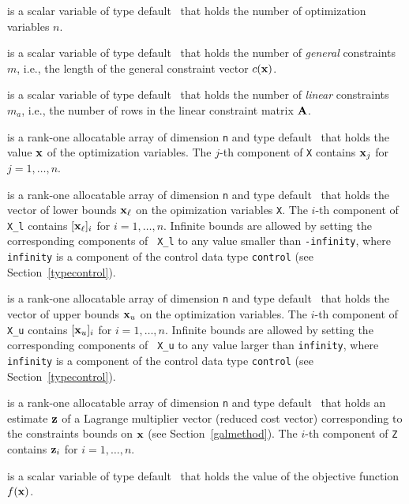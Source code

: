 \documentclass{galahad}
\begin{document}
\begin{description}

 is a scalar variable of type default \integer\ 
 that holds the number of optimization variables $n$.

 is a scalar variable of type default \integer\
 that holds the number of {\em general} constraints $m$, i.e., the length
 of the general constraint vector $c({\mathbf{x}})$.

 is a scalar variable of type default \integer\ 
 that holds the number of {\em linear} constraints $m_a$, i.e., the number
 of rows in the linear constraint matrix ${\mathbf{A}}$.

\ittf{X} is a rank-one allocatable array of dimension {\tt n} and type 
default \realdp\ that holds the value ${\mathbf{x}}$ of the optimization variables.
The $j$-th component of {\tt X} contains
${\mathbf{x}}_{j}$ for $j = 1,  \ldots , n$.

\ittf{X\_l} is a rank-one allocatable array of dimension {\tt n}
and type default \realdp\ that holds the vector of lower bounds
${\mathbf{x}}_\ell$ on the opimization variables {\tt X}. The $i$-th component of
{\tt X\_l} contains $[{\mathbf{x}}_\ell]_i$ for $i = 1, \ldots , n$.  Infinite
bounds are allowed by setting the corresponding components of {\tt
  X\_l} to any value smaller than {\tt -infinity}, where {\tt
  infinity} is a component of the control data type {\tt control} (see
Section~\ref{typecontrol}).

\ittf{X\_u}  is a rank-one allocatable array of dimension {\tt n}
and type default \realdp\ that holds the vector of upper bounds
${\mathbf{x}}_u$ on the optimization variables.  The $i$-th component of
{\tt X\_u} contains $[{\mathbf{x}}_u]_i$ for $i = 1, \ldots , n$.  Infinite
bounds are allowed by setting the corresponding components of {\tt
  X\_u} to any value larger than {\tt infinity}, where {\tt
  infinity} is a component of the control data type {\tt control} (see
Section~\ref{typecontrol}).

\ittf{Z} is a rank-one allocatable array of dimension {\tt n} and type 
default \realdp\ that holds an estimate ${\mathbf{z}}$ of a Lagrange
multiplier vector (reduced cost vector) corresponding to the
constraints bounds on ${\mathbf{x}}$ (see Section~\ref{galmethod}).
The $i$-th component of {\tt Z} contains ${\mathbf{z}}_{i}$ for $i = 1,
\ldots , n$.

\ittf{X\_status}

 is a scalar variable of type 
default \realdp\ that holds the value of the objective function $f({\mathbf{x}})$.


\end{description}
\end{document}

